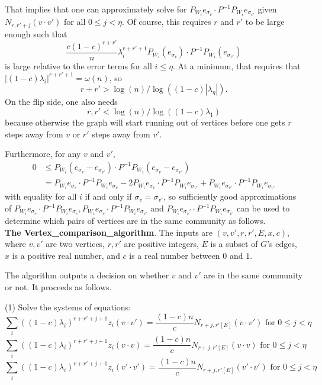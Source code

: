 \documentclass[11pt]{article}
\newcommand{\1}{\mathbb{1}}
\begin{document}
That implies that one can approximately solve for $P_{W_i}e_{\sigma_v}\cdot P^{-1}P_{W_i}e_{\sigma_{v'}}$ given $N_{r,r'+j}(v\cdot v')$ for all $0\le j<\eta$. Of course, this requires $r$ and $r'$ to be large enough such that \[\frac{c(1-c)^{r+r'}}{n} \lambda_i^{r+r'+1} P_{W_i}(e_{\sigma_v})\cdot P^{-1}P_{W_i}(e_{\sigma_{v'}})\] is large relative to the error terms for all $i\le \eta$. At a minimum, that requires that $|(1-c)\lambda_i|^{r+r'+1}=\omega(n)$, so \[r+r' >\log( n)/\log((1-c)|\lambda_{\eta}|).\] On the flip side, one also needs \[r,r'<\log(n)/\log ((1-c)\lambda_1)\] because otherwise the graph will start running out of vertices before one gets $r$ steps away from $v$ or $r'$ steps away from $v'$.

Furthermore, for any $v$ and $v'$, 
\begin{align*}
0 &\le P_{W_i}(e_{\sigma_v}-e_{\sigma_{v'}})\cdot P^{-1}P_{W_i}(e_{\sigma_v}-e_{\sigma_{v'}})\\
&=P_{W_i}e_{\sigma_v}\cdot P^{-1}P_{W_i}e_{\sigma_{v}}-2P_{W_i}e_{\sigma_v}\cdot P^{-1}P_{W_i}e_{\sigma_{v'}}+P_{W_i}e_{\sigma_{v'}}\cdot P^{-1}P_{W_i}e_{\sigma_{v'}}
\end{align*}
with equality for all $i$ if and only if $\sigma_v=\sigma_{v'}$, so sufficiently good approximations of $P_{W_i}e_{\sigma_v}\cdot P^{-1}P_{W_i}e_{\sigma_{v}}, P_{W_i}e_{\sigma_v}\cdot P^{-1}P_{W_i}e_{\sigma_{v'}}$ and $P_{W_i}e_{\sigma_v'}\cdot P^{-1}P_{W_i}e_{\sigma_{v'}}$ can be used to determine which pairs of vertices are in the same community as follows. \\

\noindent
{\bf The Vertex\_comparison\_algorithm}. 
The inputs are $(v, v', r, r',E, x, c)$, where $v,v'$ are two vertices, $r, r'$ are positive integers, $E$ is a subset of $G$'s edges, $x$ is a positive real number, and $c$ is a real number between $0$ and $1$. 

The algorithm outputs a decision on whether $v$ and $v'$ are in the same community or not. It proceeds as follows. 

(1) Solve the systems of equations: 
\[\sum_i ((1-c)\lambda_i)^{r+r'+j+1}z_i(v\cdot v')=\frac{(1-c)n}{c}N_{r+j,r'[E]}(v\cdot v') \text{ for } 0\le j<\eta\]
\[\sum_i ((1-c)\lambda_i)^{r+r'+j+1}z_i(v\cdot v)=\frac{(1-c)n}{c}N_{r+j,r'[E]}(v\cdot v) \text{ for } 0\le j<\eta\]
\[\sum_i ((1-c)\lambda_i)^{r+r'+j+1}z_i(v'\cdot v')=\frac{(1-c)n}{c}N_{r+j,r'[E]}(v'\cdot v') \text{ for } 0\le j<\eta\]
\end{document}
